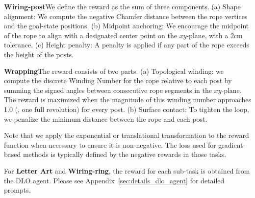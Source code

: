 \textbf{Wiring-post}\quad We define the reward as the sum of three components. (a) Shape alignment: We compute the negative Chamfer distance between the rope vertices and the goal-state positions. (b) Midpoint anchoring: We encourage the midpoint of the rope to align with a designated center point on the $xy$-plane, with a 2cm tolerance. (c) Height penalty: A penalty is applied if any part of the rope exceeds the height of the posts.

\textbf{Wrapping}\quad The reward consists of two parts. (a) Topological winding: we compute the discrete Winding Number for the rope relative to each post by summing the signed angles between consecutive rope segments in the $xy$-plane. The reward is maximized when the magnitude of this winding number approaches 1.0 (\ie, one full revolution) for every post. (b) Surface contact: To tighten the loop, we penalize the minimum distance between the rope and each post.

Note that we apply the exponential or translational transformation to the reward function when necessary to ensure it is non-negative. The loss used for gradient-based methods is typically defined by the negative rewards in those tasks.

For \textbf{Letter Art} and \textbf{Wiring-ring}, the reward for each sub-task is obtained from the DLO agent. Please see Appendix~\ref{sec:details_dlo_agent} for detailed prompts.

